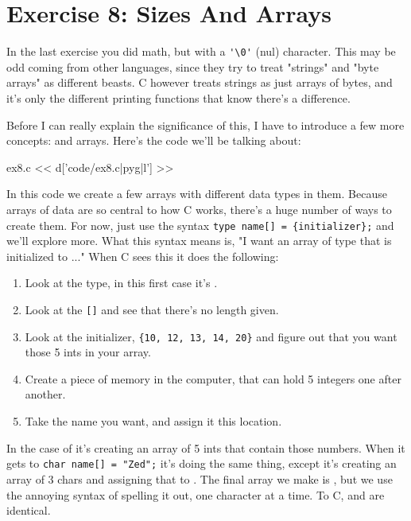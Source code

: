 \chapter{Exercise 8: Sizes And Arrays}

In the last exercise you did math, but with a \verb|'\0'| (nul) character.
This may be odd coming from other languages, since they try to treat
"strings" and "byte arrays" as different beasts.  C however treats strings
as just arrays of bytes, and it's only the different printing functions
that know there's a difference.

Before I can really explain the significance of this, I have to
introduce a few more concepts:  and arrays.  Here's
the code we'll be talking about:

\begin{code}{ex8.c}
<< d['code/ex8.c|pyg|l'] >>
\end{code}

In this code we create a few arrays with different data types in them.  Because
arrays of data are so central to how C works, there's a huge number of ways to
create them.  For now, just use the syntax \verb|type name[] = {initializer};|
and we'll explore more.  What this syntax means is, "I want an array of
type that is initialized to {..}."  When C sees this it does the following:

\begin{enumerate}
\item Look at the type, in this first case it's .
\item Look at the \verb|[]| and see that there's no length given.
\item Look at the initializer, \verb|{10, 12, 13, 14, 20}| and 
    figure out that you want those 5 ints in your array.
\item Create a piece of memory in the computer, that can hold 
    5 integers one after another.
\item Take the name you want,  and assign it this
    location.
\end{enumerate}

In the case of  it's creating an array of 5 ints
that contain those numbers.  When it gets to \verb|char name[] = "Zed";|
it's doing the same thing, except it's creating an array of 3 chars and
assigning that to .  The final array we make is ,
but we use the annoying syntax of spelling it out, one character at a time.
To C,  and  are identical.

